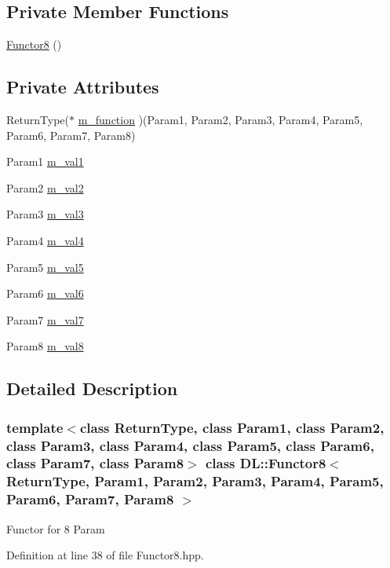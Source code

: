 \subsection*{Private Member Functions}
\begin{CompactItemize}
\item 
\hyperlink{classDL_1_1Functor8_d0}{Functor8} ()
\end{CompactItemize}
\subsection*{Private Attributes}
\begin{CompactItemize}
\item 
Return\-Type($\ast$ \hyperlink{classDL_1_1Functor8_r0}{m\_\-function} )(Param1, Param2, Param3, Param4, Param5, Param6, Param7, Param8)
\item 
Param1 \hyperlink{classDL_1_1Functor8_r1}{m\_\-val1}
\item 
Param2 \hyperlink{classDL_1_1Functor8_r2}{m\_\-val2}
\item 
Param3 \hyperlink{classDL_1_1Functor8_r3}{m\_\-val3}
\item 
Param4 \hyperlink{classDL_1_1Functor8_r4}{m\_\-val4}
\item 
Param5 \hyperlink{classDL_1_1Functor8_r5}{m\_\-val5}
\item 
Param6 \hyperlink{classDL_1_1Functor8_r6}{m\_\-val6}
\item 
Param7 \hyperlink{classDL_1_1Functor8_r7}{m\_\-val7}
\item 
Param8 \hyperlink{classDL_1_1Functor8_r8}{m\_\-val8}
\end{CompactItemize}


\subsection{Detailed Description}
\subsubsection*{template$<$class Return\-Type, class Param1, class Param2, class Param3, class Param4, class Param5, class Param6, class Param7, class Param8$>$ class DL::Functor8$<$ Return\-Type, Param1, Param2, Param3, Param4, Param5, Param6, Param7, Param8 $>$}

Functor for 8 Param



Definition at line 38 of file Functor8.hpp.

